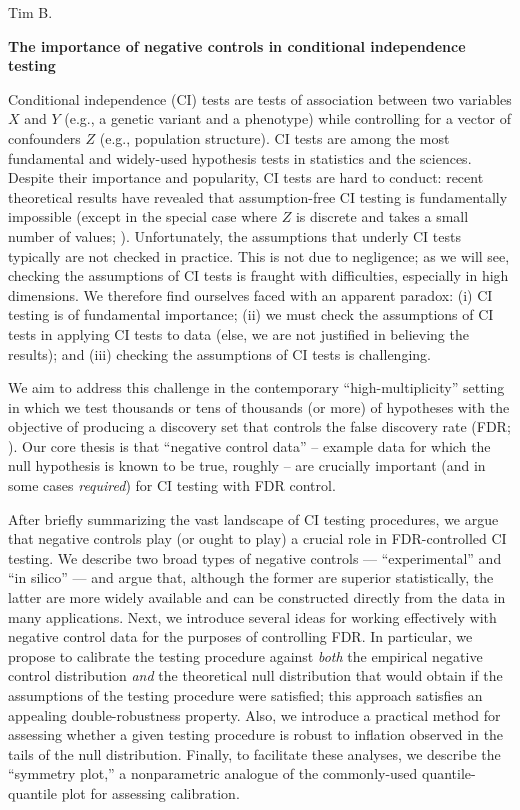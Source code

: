 \documentclass[12pt]{article}
\begin{document}
	\noindent
	Tim B.
	\begin{center}
		\textbf{The importance of negative controls in conditional independence testing}
	\end{center}

Conditional independence (CI) tests are tests of association between two variables $X$ and $Y$ (e.g., a genetic variant and a phenotype) while controlling for a vector of confounders $Z$ (e.g., population structure). CI tests are among the most fundamental and widely-used hypothesis tests in statistics and the sciences. Despite their importance and popularity, CI tests are hard to conduct: recent theoretical results have revealed that assumption-free CI testing is fundamentally impossible (except in the special case where $Z$ is discrete and takes a small number of values; \cite{Kim2021,Shah2020}). Unfortunately, the assumptions that underly CI tests typically are not checked in practice. This is not due to negligence; as we will see, checking the assumptions of CI tests is fraught with difficulties, especially in high dimensions. We therefore find ourselves faced with an apparent paradox: (i) CI testing is of fundamental importance; (ii) we must check the assumptions of CI tests in applying CI tests to data (else, we are not justified in believing the results); and (iii) checking the assumptions of CI tests is challenging.

We aim to address this challenge in the contemporary ``high-multiplicity'' setting in which we test thousands or tens of thousands (or more) of hypotheses with the objective of producing a discovery set that controls the false discovery rate (FDR; \cite{Benjamini1995, Li2021}). Our core thesis is that ``negative control data'' -- example data for which the null hypothesis is known to be true, roughly  -- are crucially important (and in some cases \textit{required}) for CI testing with FDR control.

After briefly summarizing the vast landscape of CI testing procedures, we argue that negative controls play (or ought to play) a crucial role in FDR-controlled CI testing. We describe two broad types of negative controls --- ``experimental'' and ``in silico'' --- and argue that, although the former are superior statistically, the latter are more widely available and can be constructed directly from the data in many applications. Next, we introduce several ideas for working effectively with negative control data for the purposes of controlling FDR. In particular, we propose to calibrate the testing procedure against \textit{both} the empirical negative control distribution \textit{and} the theoretical null distribution that would obtain if the assumptions of the testing procedure were satisfied; this approach satisfies an appealing double-robustness property. Also, we introduce a practical method for assessing whether a given testing procedure is robust to inflation observed in the tails of the null distribution. Finally, to facilitate these analyses, we describe the ``symmetry plot,'' a nonparametric analogue of the commonly-used quantile-quantile plot for assessing calibration.
\end{document}

